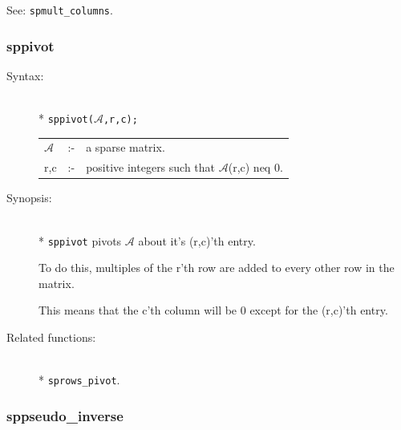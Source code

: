 See: \texttt{spmult\_columns}.


\subsubsection{sppivot}
\label{sparse:sppivot}
\hypertarget{operator:SPPIVOT}{}

\begin{description}
\item[Syntax:]\mbox{}\\*
{\tt sppivot($\mathcal{A}$,r,c);}\\[2mm]
\begin{tabular}{l l l}
$\mathcal{A}$ &:-& a sparse matrix. \\
r,c        &:-& positive integers such that $\mathcal{A}$(r,c) neq 0.
\end{tabular}

\item[Synopsis:]\mbox{}\\*
\texttt{sppivot} pivots $\mathcal{A}$ about it's (r,c)'th entry.

To do this, multiples of the r'th row are added to every
     other row in the matrix.

This means that the c'th column
                will be 0 except for the (r,c)'th entry.

\item[Related functions:]\mbox{}\\*
\texttt{sprows\_pivot}.
\end{description}


\subsubsection{sppseudo\_inverse}
\label{sparse:sppseudo_inverse}
\hypertarget{operator:SPPSEUDO_INVERSE}{}

